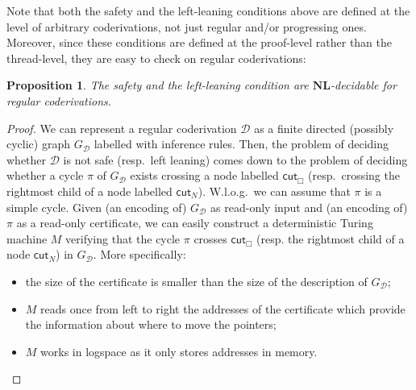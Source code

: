 \documentclass[manuscript,screen]{acmart}
\newtheorem{prop}[thm]{Proposition}
\theoremstyle{definition}
\theoremstyle{remark}
\newcommand{\n}{N}
\newcommand{\sq}{\Box}
\newcommand{\der}{\mathcal{D}}
\newcommand{\cut}{\mathsf{cut}}
\begin{document}
Note that both the safety and the left-leaning conditions above are defined at the level of arbitrary coderivations, not just regular and/or progressing ones. Moreover, since these conditions are defined at the proof-level rather than the thread-level, they are easy to check on regular coderivations:
\begin{prop} \label{prop:safety-left-leaning-NL} The safety and the left-leaning condition are $\mathbf{NL}$-decidable for regular coderivations.
\end{prop}
\begin{proof} We can represent a regular coderivation $\der$ as a  finite directed (possibly cyclic) graph $G_\der$ labelled with inference rules. Then,  the problem of deciding whether $\der$ is not safe (resp.~left leaning) comes down to the problem of deciding whether  a cycle $\pi$ of $G_\der$  exists crossing a node labelled $\cut_\sq$ (resp.~crossing the rightmost child of a node labelled $\cut_\n$).  W.l.o.g.~we can assume that $\pi$ is a simple cycle. Given (an encoding of)  $G_\der$ as read-only input and (an encoding of) $\pi$ as a read-only  certificate, we can easily construct a deterministic Turing machine $M$ verifying that the cycle $\pi$ crosses $\cut_\sq$ (resp. the rightmost child of a node $\cut_\n$) in $G_\der$. More specifically:
\begin{itemize}
    \item the size of the certificate is smaller than the size of the description of $G_\der$;
    \item  $M$ reads once from left to right the addresses of the certificate which provide the information about where to move the pointers;
    \item $M$ works in logspace as it only stores addresses in memory. \qedhere
\end{itemize}
\end{proof}
\end{document}
